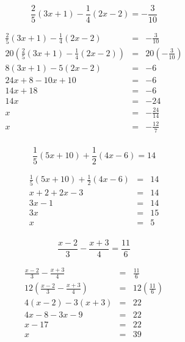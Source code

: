 \documentclass[fleqn,addpoints]{exam}
\begin{document}
\begin{questions}
\question[5]
\[ \frac{2}{5}(3x + 1) - \frac{1}{4}(2x - 2) = -\frac{3}{10} \]
\begin{solution}[4 cm]
\begin{eqnarray*}
  \frac{2}{5}(3x + 1) - \frac{1}{4}(2x - 2) &=& -\frac{3}{10} \\
  20 \left( \frac{2}{5}(3x + 1) - \frac{1}{4}(2x - 2) \right) &=& 20 \left( -\frac{3}{10} \right) \\
  8(3x + 1) - 5(2x - 2) &=& -6 \\
  24x + 8 - 10x + 10 &=& -6 \\
  14x + 18 &=& -6 \\
  14x &=& -24 \\
  x &=& -\frac{24}{14} \\
  x &=& -\frac{12}{7} \\
\end{eqnarray*}
\end{solution}

\question[5]
\[ \frac{1}{5}(5x + 10) + \frac{1}{2}(4x - 6) = 14 \]
\begin{solution}[4 cm]
\begin{eqnarray*}
  \frac{1}{5}(5x + 10) + \frac{1}{2}(4x - 6) &=& 14 \\
  x + 2 + 2x - 3 &=& 14 \\
  3x - 1 &=& 14 \\
  3x &=& 15 \\
  x  &=& 5 \\
\end{eqnarray*}
\end{solution}

\question[5]
\[ \frac{x - 2}{3} - \frac{x + 3}{4} = \frac{11}{6} \]
\begin{solution}[4 cm]
\begin{eqnarray*}
  \frac{x - 2}{3} - \frac{x + 3}{4} &=& \frac{11}{6} \\
  12 \left( \frac{x - 2}{3} - \frac{x + 3}{4} \right) &=& 12 \left( \frac{11}{6} \right) \\
  4(x - 2) - 3(x + 3) &=& 22 \\
  4x - 8 - 3x - 9 &=& 22 \\
  x - 17 &=& 22 \\
  x      &=& 39 \\
\end{eqnarray*}
\end{solution}


\end{questions}
\end{document}

